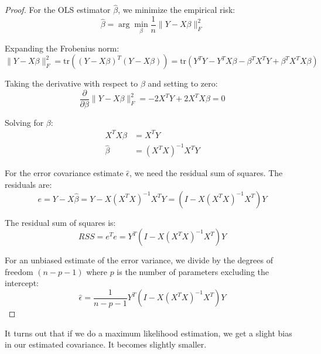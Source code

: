   \begin{proof}
    For the OLS estimator $\hat{\beta}$, we minimize the empirical risk:
    \begin{equation}
      \hat{\beta} = \arg\min_{\beta} \frac{1}{n} \|Y - X\beta\|_F^2
    \end{equation}
   
    Expanding the Frobenius norm:
    \begin{equation}
      \|Y - X\beta\|_F^2 = \text{tr}((Y - X\beta)^T(Y - X\beta)) = \text{tr}(Y^TY - Y^TX\beta - \beta^TX^TY + \beta^TX^TX\beta)
    \end{equation}
   
    Taking the derivative with respect to $\beta$ and setting to zero:
    \begin{equation}
      \frac{\partial}{\partial \beta} \|Y - X\beta\|_F^2 = -2X^TY + 2X^TX\beta = 0
    \end{equation}
   
    Solving for $\beta$:
    \begin{align}
      X^TX\beta &= X^TY \\
      \hat{\beta} &= (X^TX)^{-1}X^TY
    \end{align}
   
    For the error covariance estimate $\hat{\epsilon}$, we need the residual sum of squares. The residuals are:
    \begin{equation}
      e = Y - X\hat{\beta} = Y - X(X^TX)^{-1}X^TY = (I - X(X^TX)^{-1}X^T)Y
    \end{equation}
   
    The residual sum of squares is:
    \begin{equation}
      RSS = e^Te = Y^T(I - X(X^TX)^{-1}X^T)Y
    \end{equation}
   
    For an unbiased estimate of the error variance, we divide by the degrees of freedom $(n - p - 1)$ where $p$ is the number of parameters  excluding the intercept:
    \begin{equation}
      \hat{\epsilon} = \frac{1}{n - p - 1} Y^T(I - X(X^TX)^{-1}X^T)Y
    \end{equation}
  \end{proof}

  It turns out that if we do a maximum likelihood estimation, we get a slight bias in our estimated covariance. It becomes slightly smaller. 

